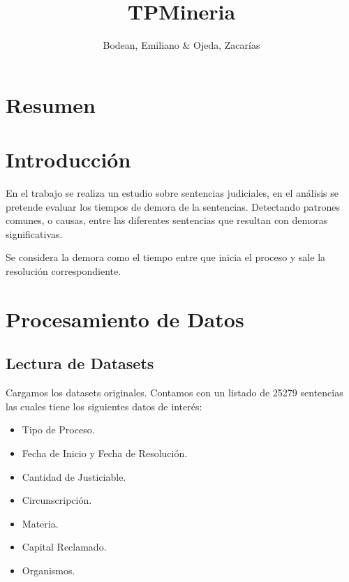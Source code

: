 \documentclass[runningheads,a4paper]{llncs}
\def\tightlist{} %
\begin{document}
\title{TPMineria}
\author{Bodean, Emiliano \& Ojeda, Zacarías}



\institute{
}

%
\iffalse
\authorinfo{
  
}{
}{
  \{\}
}
\fi


\maketitle



\section{Resumen}\label{resumen}

\section{Introducción}\label{introduccion}

En el trabajo se realiza un estudio sobre sentencias judiciales, en el
análisis se pretende evaluar los tiempos de demora de la sentencias.
Detectando patrones comunes, o causas, entre las diferentes sentencias
que resultan con demoras significativas.

Se considera la demora como el tiempo entre que inicia el proceso y sale
la resolución correspondiente.

\section{Procesamiento de Datos}\label{procesamiento-de-datos}

\subsection{Lectura de Datasets}\label{lectura-de-datasets}

Cargamos los datasets originales. Contamos con un listado de 25279
sentencias las cuales tiene los siguientes datos de interés:

\begin{itemize}
\tightlist
\item
  Tipo de Proceso.
\item
  Fecha de Inicio y Fecha de Resolución.
\item
  Cantidad de Justiciable.
\item
  Circunscripción.
\item
  Materia.
\item
  Capital Reclamado.
\item
  Organismos.
\end{itemize}
\end{document}
